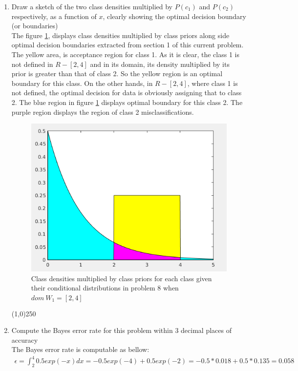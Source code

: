 \documentclass[12pt]{article}
\begin{document}
\begin{enumerate}
\item Draw a sketch of the two class densities multiplied by $P(c_1)$ and $P(c_2)$ respectively, as a
function of $x$, clearly showing the optimal decision boundary (or boundaries) \\
The figure \ref{fig:8-1}, displays class densities multiplied by class priors along side optimal decision boundaries extracted from section 1 of this current problem.\\
The yellow area, is acceptance region for class 1. As it is clear, the class 1 is not defined in $R-[2,4]$ and in its domain, its density multiplied by its prior is greater than that of class 2. So the yellow region is an optimal boundary for this class. On the other hands, in $R-[2,4]$, where class 1 is not defined, the optimal decision for data is obviously assigning that to class 2. The blue region in figure \ref{fig:8-1} displays optimal boundary for this class 2. The purple region displays the region of class 2 misclassifications.
\begin{figure}[h]
\centering
\includegraphics[scale=0.5]{Imgs/8-1.png}
\caption{Class densities multiplied by class priors for each class given their conditional distributions in problem 8 when $dom \> W_1 = [2,4]$}
\label{fig:8-1}
\end{figure}



\begin{center}
\line(1,0){250}
\end{center}

\item Compute the Bayes error rate for this problem within 3 decimal places of accuracy\\
The Bayes error rate is computable as bellow:
\begin{align*}
\epsilon = \int_2^4 0.5exp(-x)dx = -0.5exp(-4) + 0.5 exp(-2) = -0.5 * 0.018 + 0.5 * 0.135 = 0.058
\end{align*}


\end{enumerate}
\end{document}
